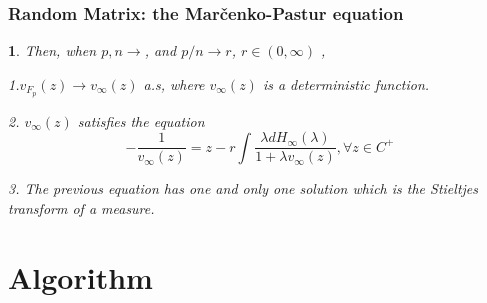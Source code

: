 \documentclass[aspectratio=169, 10pt, utf8, mathserif]{beamer}
\newtheorem{blk}{ }
\begin{document}
\begin{frame}
	\frametitle{Random Matrix: the Mar\v{c}enko-Pastur equation}
		\begin{blk}
	Then, when $p,n\rightarrow$, and $p/n\rightarrow r$, $r\in(0,\infty)$ ,
	
	1.$v_{F_p}(z)\rightarrow v_\infty(z)$ a.s, where $v_\infty(z)$ is a deterministic function.
	
	2. $v_\infty(z)$ satisﬁes the equation \[-\frac{1}{v_\infty(z)}=z-r\int\frac{\lambda dH_\infty(\lambda)}{1+\lambda v_\infty(z)},\forall z\in C^+\]
	
	3. The previous equation has one and only one solution which is the Stieltjes transform of a measure.
	\end{blk}
	 
\end{frame}
\section{Algorithm}
\end{document}
